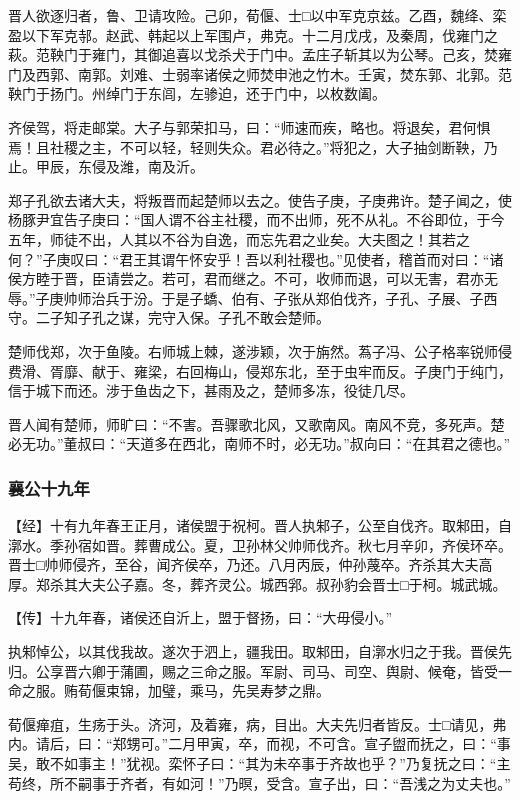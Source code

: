 \documentclass[]{article}
\begin{document}
晋人欲逐归者，鲁、卫请攻险。己卯，荀偃、士□以中军克京兹。乙酉，魏绛、栾盈以下军克邿。赵武、韩起以上军围卢，弗克。十二月戊戌，及秦周，伐雍门之萩。范鞅门于雍门，其御追喜以戈杀犬于门中。孟庄子斩其以为公琴。己亥，焚雍门及西郭、南郭。刘难、士弱率诸侯之师焚申池之竹木。壬寅，焚东郭、北郭。范鞅门于扬门。州绰门于东闾，左骖迫，还于门中，以枚数阖。

齐侯驾，将走邮棠。大子与郭荣扣马，曰：``师速而疾，略也。将退矣，君何惧焉！且社稷之主，不可以轻，轻则失众。君必待之。''将犯之，大子抽剑断鞅，乃止。甲辰，东侵及潍，南及沂。

郑子孔欲去诸大夫，将叛晋而起楚师以去之。使告子庚，子庚弗许。楚子闻之，使杨豚尹宜告子庚曰：``国人谓不谷主社稷，而不出师，死不从礼。不谷即位，于今五年，师徒不出，人其以不谷为自逸，而忘先君之业矣。大夫图之！其若之何？''子庚叹曰：``君王其谓午怀安乎！吾以利社稷也。''见使者，稽首而对曰：``诸侯方睦于晋，臣请尝之。若可，君而继之。不可，收师而退，可以无害，君亦无辱。''子庚帅师治兵于汾。于是子蟜、伯有、子张从郑伯伐齐，子孔、子展、子西守。二子知子孔之谋，完守入保。子孔不敢会楚师。

楚师伐郑，次于鱼陵。右师城上棘，遂涉颖，次于旃然。蒍子冯、公子格率锐师侵费滑、胥靡、献于、雍梁，右回梅山，侵郑东北，至于虫牢而反。子庚门于纯门，信于城下而还。涉于鱼齿之下，甚雨及之，楚师多冻，役徒几尽。

晋人闻有楚师，师旷曰：``不害。吾骤歌北风，又歌南风。南风不竞，多死声。楚必无功。''董叔曰：``天道多在西北，南师不时，必无功。''叔向曰：``在其君之德也。''

\hypertarget{header-n2070}{%
\subsubsection{襄公十九年}\label{header-n2070}}

【经】十有九年春王正月，诸侯盟于祝柯。晋人执邾子，公至自伐齐。取邾田，自漷水。季孙宿如晋。葬曹成公。夏，卫孙林父帅师伐齐。秋七月辛卯，齐侯环卒。晋士□帅师侵齐，至谷，闻齐侯卒，乃还。八月丙辰，仲孙蔑卒。齐杀其大夫高厚。郑杀其大夫公子嘉。冬，葬齐灵公。城西郛。叔孙豹会晋士□于柯。城武城。

【传】十九年春，诸侯还自沂上，盟于督扬，曰：``大毋侵小。''

执邾悼公，以其伐我故。遂次于泗上，疆我田。取邾田，自漷水归之于我。晋侯先归。公享晋六卿于蒲圃，赐之三命之服。军尉、司马、司空、舆尉、候奄，皆受一命之服。贿荀偃束锦，加璧，乘马，先吴寿梦之鼎。

荀偃瘅疽，生疡于头。济河，及着雍，病，目出。大夫先归者皆反。士□请见，弗内。请后，曰：``郑甥可。''二月甲寅，卒，而视，不可含。宣子盥而抚之，曰：``事吴，敢不如事主！''犹视。栾怀子曰：``其为未卒事于齐故也乎？''乃复抚之曰：``主苟终，所不嗣事于齐者，有如河！''乃暝，受含。宣子出，曰：``吾浅之为丈夫也。''
\end{document}
